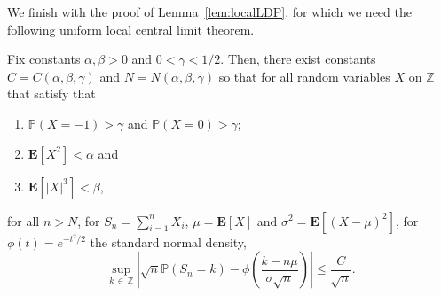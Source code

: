 \documentclass[AHL,Unicode,longabstracts,published]{cedram}
\newcommand{\Z}{\mathbb{Z}}
\renewcommand{\P}{\mathbb{P}}
\newcommand{\E}[1]{{\mathbf E}\left[#1\right]}
\begin{document}
We finish with the proof of Lemma~\ref{lem:localLDP}, for which we need the following uniform local central limit theorem.
\begin{lemm}\label{lem:local}
Fix constants $\alpha, \beta >0$ and $0<\gamma<1/2$. Then, there exist constants $C=C(\alpha, \beta, \gamma)$ and $N=N(\alpha, \beta, \gamma)$ so that for all random variables $X$ on $\Z$ that satisfy that
\begin{enumerate}
\item $\P(X=-1)>\gamma$ and $\P(X=0)>\gamma$;
\item $\E{X^2}<\alpha$ and
\item $\E{|X|^3}<\beta $,
\end{enumerate}
for all $n>N$, for $S_n=\sum_{i=1}^n X_i$, $\mu=\E{X}$ and $\sigma^2=\E{(X-\mu)^2}$, for $\phi(t)=e^{-t^2/2}$ the standard normal density,
\[
\sup_{k\,\in\,\Z} \left|\sqrt{n}\P\left(S_n=k\right)-\phi\left(\frac{k-n\mu}{\sigma\sqrt{n}}\right) \right|\leq \frac{C}{\sqrt{n}}.
\]
\end{lemm}
\end{document}

